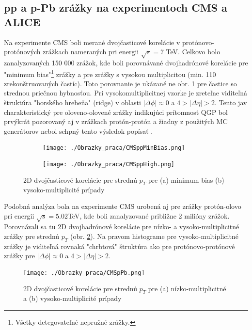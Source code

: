 \documentclass[thesismargins, thesislinespacing]{rnthesis}
\begin{document}
\subsection{pp a p-Pb zrážky na experimentoch CMS a ALICE}
\label{textAliceCms}
Na experimente CMS boli merané dvojčasticové korelácie v protónovo-protónových zrážkach nameraných pri energii $\sqrt{s}=$7 TeV. Celkovo bolo zanalyzovaných 150 000 zrážok, kde boli porovnávané dvojhadrónové korelácie pre "minimum bias"\footnote{Všetky detegovateľné nepružné zrážky.} zrážky a pre zrážky s vysokou multiplicitou (min. 110 zrekonštruovaných častíc). Toto porovnanie je ukázané ne obr. \ref{CMSpp} pre častice so strednou priečnou hybnosťou. Pri vysokomultiplicitnej vzorke je zreteľne viditeľná štruktúra "horského hrebeňa" (ridge) v oblasti $|\Delta \phi|\approx0$ a $4>|\Delta \eta|>2$. Tento jav charakteristický pre oloveno-olovené zrážky indikujúci prítomnosť QGP bol prvýkrát pozorovaný aj v zrážkach protón-protón a žiadny z použitých MC generátorov nebol schpný tento výsledok popísať \cite{CMSpp}. 

\begin{figure}[hbtp!]
	\centering
	\begin{subfigure}{0.5\textwidth}
		\centering
		\texttt{[image: ./Obrazky\_praca/CMSppMinBias.png]}
		\caption{}
	\end{subfigure}%
	\begin{subfigure}{0.5\textwidth}
		\centering
		\texttt{[image: ./Obrazky\_praca/CMSppHigh.png]}
		\caption{}
	\end{subfigure}
	\caption{2D dvojčasticové korelácie pre strednú $p_{T}$ pre (a) minimum bias (b) vysoko-multiplicité prípady\cite{CMSpp}}
	\label{CMSpp}
\end{figure}

Podobná analýza bola na experimente CMS urobená aj pre zrážky protón-olovo pri energii $\sqrt{s}=5.02$TeV, kde boli zanalyzované približne 2 milióny zrážok. Porovnávali sa tu 2D dvojhadrónové korelácie pre nízko- a vysoko-multiplicitné zrážky pre strednú $p_{T}$ (obr. \ref{CMSpPb}). Na pravom histograme pre vysoko-multiplicitné zrážky je viditeľná rovnaká "chrbtová" štruktúra ako pre protónovo-protónové zrážky  pre $|\Delta \phi|\approx0$  a $4>|\Delta \eta|>2$.

\begin{figure}[hbtp!]
		\centering
		\texttt{[image: ./Obrazky\_praca/CMSpPb.png]}
	\caption{2D dvojčasticové korelácie pre strednú $p_{T}$ pre (a) nízko-multiplicitné a (b) vysoko-multiplicité prípady\cite{CMSpPb}}
	\label{CMSpPb}
\end{figure}
\end{document}
